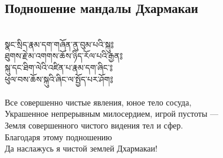 \subsection{Подношение мандалы Дхармакаи}
\\
\ti
སྣང་སྲིད་རྣམ་དག་གཞོན་ནུ་བུམ་པའི་སྐུ༔ \\
ཐུགས་རྗེ་མ་འགགས་ཆོས་ཉིད་རོལ་པའི་རྒྱན༔\\
སྐུ་དང་ཐིག་ལེའི་འཛིན་པ་རྣམ་དག་ཞིང་༔\\
ཕུལ་བས་ཆོས་སྐུའི་ཞིང་ལ་སྤྱོད་པར་ཤོག༔\\
\\
\ru
Все совершенно чистые явления, юное тело сосуда,\\
Украшенное непрерывным милосердием, игрой пустоты —\\
Земля совершенного чистого видения тел и сфер.\\
Благодаря этому подношению\\
Да наслажусь я чистой землей Дхармакаи!\\


